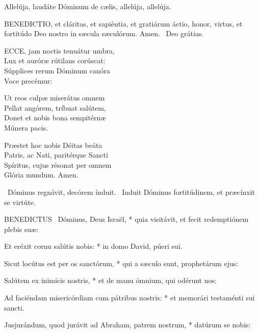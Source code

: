  Allelúja, laudáte Dóminum de cælis, allelúja, allelúja.



\lettrine[lines=2]{B}{ENEDICTIO}, et cláritas, et sapiéntia, et gratiárum áctio, honor, virtus, et fortitúdo Deo nostro in sæcula sæculórum. Amen. \R\ Deo grátias.



\lettrine[lines=2]{E}{CCE}, jam noctis tenuátur umbra,\\
Lux et auróræ rútilans corúscat:\\
Súpplices rerum Dóminum canóra\\
Voce precémur:

Ut reos culpæ miserátus omnem\\
Pellat angórem, tríbuat salútem,\\
Donet et nobis bona sempitérnæ\\
Múnera pacis.

Præstet hoc nobis Déitas beáta\\
Patris, ac Nati, paritérque Sancti\\
Spíritus, cujus résonat per omnem\\
Glória mundum. Amen.

\V\ Dóminus regnávit, decórem índuit. \R\ Induit Dóminus fortitúdinem, et præcínxit se virtúte.



\lettrine[lines=2]{B}{ENEDICTUS} \textdagger\ Dóminus, Deus Israël, * quia visitávit, et fecit redemptiónem plebis suæ:

Et eréxit cornu salútis nobis: * in domo David, púeri sui.

Sicut locútus est per os sanctórum, * qui a sæculo sunt, prophetárum ejus:

Salútem ex inimícis nostris, * et de manu ómnium, qui odérunt nos:

Ad faciéndam misericórdiam cum pátribus nostris: * et memorári testaménti sui sancti.

Jusjurándum, quod jurávit ad Abraham, patrem nostrum, * datúrum se nobis:

